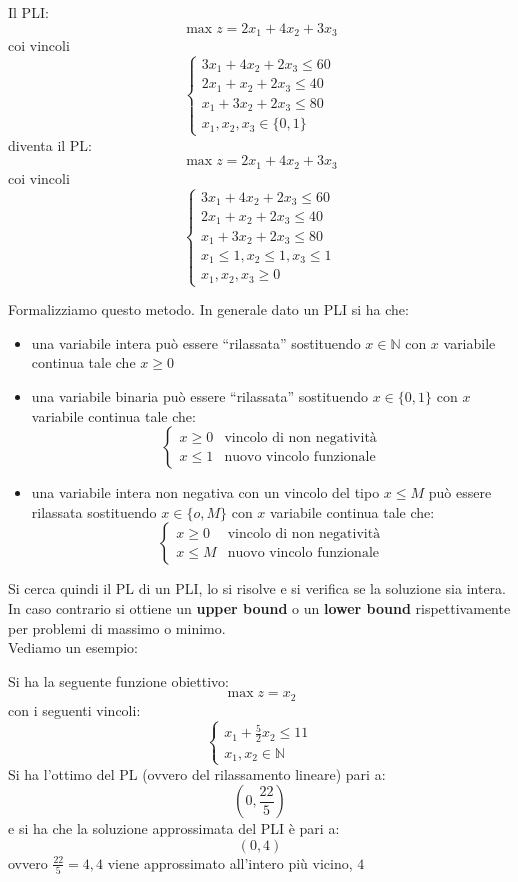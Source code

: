 \documentclass[a4paper,12pt, oneside]{book}
\begin{document}
\begin{esempio}
  Il PLI:
  \[\max z=2x_1+4x_2+3x_3\]
  coi vincoli
  \[
    \begin{cases}
      3x_1+4x_2+2x_3\leq 60\\
      2x_1+x_2+2x_3\leq 40\\
      x_1+3x_2+2x_3\leq 80\\
      x_1,x_2,x_3\in\{0,1\}
    \end{cases}
  \]
  diventa il PL:
  \[\max z=2x_1+4x_2+3x_3\]
  coi vincoli
  \[
    \begin{cases}
      3x_1+4x_2+2x_3\leq 60\\
      2x_1+x_2+2x_3\leq 40\\
      x_1+3x_2+2x_3\leq 80\\
      x_1\leq 1, x_2\leq 1, x_3\leq 1\\
      x_1,x_2,x_3\geq 0
    \end{cases}
  \]
\end{esempio}
Formalizziamo questo metodo. In generale dato un PLI si ha che:
\begin{itemize}
  \item una variabile intera può essere ``rilassata'' sostituendo
  $x\in\mathbb{N}$ con $x$ variabile continua tale che $x\geq 0$
  \item una variabile binaria può essere ``rilassata'' sostituendo
  $x\in\{0,1\}$ con $x$ variabile continua tale che:
  \[
    \begin{cases}
      x\geq 0 & \mbox{vincolo di non negatività}\\
      x\leq 1 & \mbox{nuovo vincolo funzionale}
    \end{cases}
  \]
  \item una variabile intera non negativa con un vincolo del tipo
  $x\leq M$ può essere rilassata sostituendo $x\in\{o,M\}$ con $x$
  variabile continua tale che:
  \[
    \begin{cases}
      x\geq 0 & \mbox{vincolo di non negatività}\\
      x\leq M & \mbox{nuovo vincolo funzionale}
    \end{cases}
  \]
\end{itemize}
Si cerca quindi il PL di un PLI, lo si risolve e si verifica se la
soluzione sia intera. In caso contrario si ottiene un \textbf{upper
  bound} o un \textbf{lower bound} rispettivamente per problemi di
massimo o minimo. \\
Vediamo un esempio:
\begin{esempio}
  Si ha la seguente funzione obiettivo:
  \[\max z=x_2\]
  con i seguenti vincoli:
  \[
    \begin{cases}
      x_1+\frac{5}{2}x_2\leq 11\\
      x_1,x_2\in\mathbb{N}
    \end{cases}
  \]
  Si ha l'ottimo del PL (ovvero del rilassamento lineare) pari a:
  \[\left(0,\frac{22}{5}\right)\]
  e si ha che la soluzione approssimata del PLI è pari a:
  \[(0,4)\]
  ovvero $\frac{22}{5}=4,4$ viene approssimato all'intero più vicino, $4$
\end{esempio}
\end{document}

